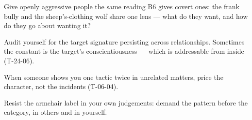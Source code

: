 \begin{countermeasures}
  \item Give openly aggressive people the same reading B6 gives covert ones: the frank bully and the sheep's-clothing wolf share one lens --- what do they want, and how do they go about wanting it?
  \item Audit yourself for the target signature persisting across relationships. Sometimes the constant is the target's conscientiousness --- which is addressable from inside (T-24-06).
  \item When someone shows you one tactic twice in unrelated matters, price the character, not the incidents (T-06-04).
  \item Resist the armchair label in your own judgements: demand the pattern before the category, in others and in yourself.
\end{countermeasures}

\seesources
{}
